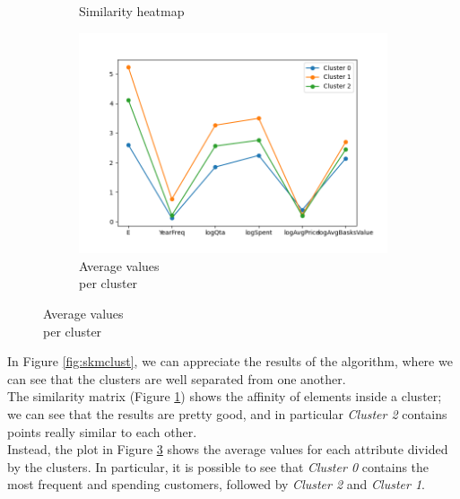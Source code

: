 \begin{figure}[h!]
\begin{subfigure}{0.32\textwidth}
        \caption{Similarity heatmap}
        \label{fig:sim_heatmap}
    \end{subfigure}
    \begin{subfigure}{0.32\textwidth}
        \includegraphics[width=\textwidth]{img/clustering/cluster_avg.png}
	\caption{Average values\\ per cluster}
        \label{fig:km_avg}
    \end{subfigure}
\end{figure}

In Figure \ref{fig:skmclust}, we can appreciate the results of the algorithm, where we can see that the clusters are well separated from one another.\\
The similarity matrix (Figure \ref{fig:sim_heatmap}) shows the affinity of elements inside a cluster; we can see that the results are pretty good, and in particular \emph{Cluster 2} contains points really similar to each other.\\
Instead, the plot in Figure \ref{fig:km_avg} shows the average values for each attribute divided by the clusters. In particular, it is possible to see that \emph{Cluster 0} contains the most frequent and spending customers, followed by \emph{Cluster 2} and \emph{Cluster 1}.

